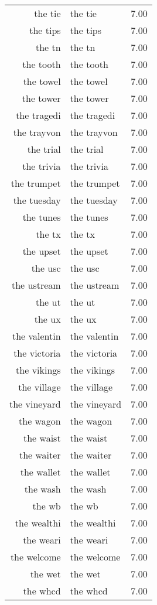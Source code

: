 \begin{table}[ht]
\begin{tabular}{rlr}
  the tie & the tie & 7.00 \\ 
  the tips & the tips & 7.00 \\ 
  the tn & the tn & 7.00 \\ 
  the tooth & the tooth & 7.00 \\ 
  the towel & the towel & 7.00 \\ 
  the tower & the tower & 7.00 \\ 
  the tragedi & the tragedi & 7.00 \\ 
  the trayvon & the trayvon & 7.00 \\ 
  the trial & the trial & 7.00 \\ 
  the trivia & the trivia & 7.00 \\ 
  the trumpet & the trumpet & 7.00 \\ 
  the tuesday & the tuesday & 7.00 \\ 
  the tunes & the tunes & 7.00 \\ 
  the tx & the tx & 7.00 \\ 
  the upset & the upset & 7.00 \\ 
  the usc & the usc & 7.00 \\ 
  the ustream & the ustream & 7.00 \\ 
  the ut & the ut & 7.00 \\ 
  the ux & the ux & 7.00 \\ 
  the valentin & the valentin & 7.00 \\ 
  the victoria & the victoria & 7.00 \\ 
  the vikings & the vikings & 7.00 \\ 
  the village & the village & 7.00 \\ 
  the vineyard & the vineyard & 7.00 \\ 
  the wagon & the wagon & 7.00 \\ 
  the waist & the waist & 7.00 \\ 
  the waiter & the waiter & 7.00 \\ 
  the wallet & the wallet & 7.00 \\ 
  the wash & the wash & 7.00 \\ 
  the wb & the wb & 7.00 \\ 
  the wealthi & the wealthi & 7.00 \\ 
  the weari & the weari & 7.00 \\ 
  the welcome & the welcome & 7.00 \\ 
  the wet & the wet & 7.00 \\ 
  the whcd & the whcd & 7.00 \\ 

\end{tabular}
\end{table}
